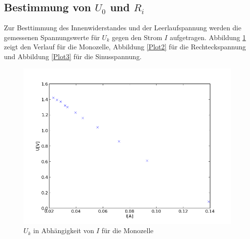 \documentclass[11pt]{article}
\begin{document}
\subsection{Bestimmung von $U_0$ und $R_i$}
Zur Besttimmung des Innenwiderstandes und der Leerlaufspannung werden die gemessenen Spannungswerte f\"ur $U_k$ gegen den Strom $I$ aufgetragen. Abbildung \ref{Plot1} zeigt den Verlauf f\"ur die Monozelle, Abbildung \ref{Plot2} f\"ur die Rechteckspannung und Abbildung \ref{Plot3} f\"ur die Sinusspannung. 
\begin{figure}
\centering
\includegraphics[scale=1.00]{Plot1.png}
\caption{$U_k$ in Abh\"angigkeit von $I$ f\"ur die Monozelle}
\label{Plot1}
\end{figure}
\end{document}
